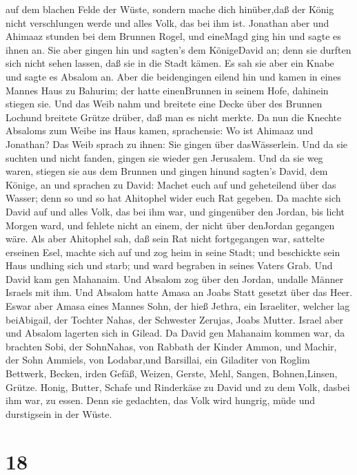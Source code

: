 auf dem blachen Felde der Wüste, sondern mache dich hinüber,daß der
König nicht verschlungen werde und alles Volk, das bei ihm ist.
 Jonathan aber und Ahimaaz stunden bei dem Brunnen Rogel,
und eineMagd ging hin und sagte es ihnen an. Sie aber gingen hin und
sagten's dem KönigeDavid an; denn sie durften sich nicht sehen lassen,
daß sie in die Stadt kämen.  Es sah sie aber ein Knabe und
sagte es Absalom an. Aber die beidengingen eilend hin und kamen in eines
Mannes Haus zu Bahurim; der hatte einenBrunnen in seinem Hofe, dahinein
stiegen sie.  Und das Weib nahm und breitete eine Decke
über des Brunnen Lochund breitete Grütze drüber, daß man es nicht
merkte.  Da nun die Knechte Absaloms zum Weibe ins Haus
kamen, sprachensie: Wo ist Ahimaaz und Jonathan? Das Weib sprach zu
ihnen: Sie gingen über dasWässerlein. Und da sie suchten und nicht
fanden, gingen sie wieder gen Jerusalem.  Und da sie weg
waren, stiegen sie aus dem Brunnen und gingen hinund sagten's David, dem
Könige, an und sprachen zu David: Machet euch auf und geheteilend über
das Wasser; denn so und so hat Ahitophel wider euch Rat gegeben.
 Da machte sich David auf und alles Volk, das bei ihm war,
und gingenüber den Jordan, bis licht Morgen ward, und fehlete nicht an
einem, der nicht über denJordan gegangen wäre.  Als aber
Ahitophel sah, daß sein Rat nicht fortgegangen war, sattelte erseinen
Esel, machte sich auf und zog heim in seine Stadt; und beschickte sein
Haus undhing sich und starb; und ward begraben in seines Vaters Grab.
 Und David kam gen Mahanaim. Und Absalom zog über den
Jordan, undalle Männer Israels mit ihm.  Und Absalom hatte
Amasa an Joabs Statt gesetzt über das Heer. Eswar aber Amasa eines
Mannes Sohn, der hieß Jethra, ein Israeliter, welcher lag beiAbigail,
der Tochter Nahas, der Schwester Zerujas, Joabs Mutter. 
Israel aber und Absalom lagerten sich in Gilead.  Da David
gen Mahanaim kommen war, da brachten Sobi, der SohnNahas, von Rabbath
der Kinder Ammon, und Machir, der Sohn Ammiels, von Lodabar,und
Barsillai, ein Giladiter von Roglim  Bettwerk, Becken,
irden Gefäß, Weizen, Gerste, Mehl, Sangen, Bohnen,Linsen, Grütze.
 Honig, Butter, Schafe und Rinderkäse zu David und zu dem
Volk, dasbei ihm war, zu essen. Denn sie gedachten, das Volk wird
hungrig, müde und durstigsein in der Wüste.

\hypertarget{section-17}{%
\section{18}\label{section-17}}

